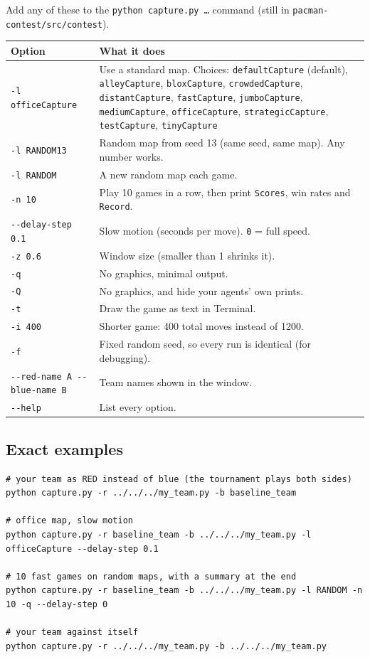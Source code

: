 \documentclass[11pt,a4paper]{article}
\newcommand{\p}[1]{\nolinkurl{#1}}  %
\begin{document}
Add any of these to the \texttt{python capture.py \ldots} command (still in \p{pacman-contest/src/contest}).

\begin{center}
\begin{tabularx}{\linewidth}{@{}lX@{}}
\toprule
\textbf{Option} & \textbf{What it does} \\
\midrule
\p{-l officeCapture} & Use a standard map. Choices: \texttt{defaultCapture} (default), \texttt{alleyCapture}, \texttt{bloxCapture},
  \texttt{crowdedCapture}, \texttt{distantCapture}, \texttt{fastCapture}, \texttt{jumboCapture}, \texttt{mediumCapture},
  \texttt{officeCapture}, \texttt{strategicCapture}, \texttt{testCapture}, \texttt{tinyCapture} \\
\p{-l RANDOM13} & Random map from seed 13 (same seed, same map). Any number works. \\
\p{-l RANDOM} & A new random map each game. \\
\p{-n 10} & Play 10 games in a row, then print \texttt{Scores}, win rates and \texttt{Record}. \\
\p{--delay-step 0.1} & Slow motion (seconds per move). \texttt{0} = full speed. \\
\p{-z 0.6} & Window size (smaller than 1 shrinks it). \\
\p{-q} & No graphics, minimal output. \\
\p{-Q} & No graphics, and hide your agents' own prints. \\
\p{-t} & Draw the game as text in Terminal. \\
\p{-i 400} & Shorter game: 400 total moves instead of 1200. \\
\p{-f} & Fixed random seed, so every run is identical (for debugging). \\
\p{--red-name A --blue-name B} & Team names shown in the window. \\
\p{--help} & List every option. \\
\bottomrule
\end{tabularx}
\end{center}

\subsection{Exact examples}
\begin{lstlisting}
# your team as RED instead of blue (the tournament plays both sides)
python capture.py -r ../../../my_team.py -b baseline_team

# office map, slow motion
python capture.py -r baseline_team -b ../../../my_team.py -l officeCapture --delay-step 0.1

# 10 fast games on random maps, with a summary at the end
python capture.py -r baseline_team -b ../../../my_team.py -l RANDOM -n 10 -q --delay-step 0

# your team against itself
python capture.py -r ../../../my_team.py -b ../../../my_team.py
\end{lstlisting}
\end{document}

